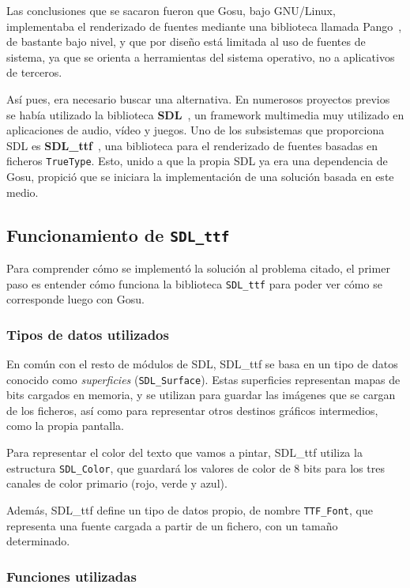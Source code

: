 Las conclusiones que se sacaron fueron que Gosu, bajo GNU/Linux, implementaba el
renderizado de fuentes mediante una biblioteca llamada Pango~\cite{Pango}, de
bastante bajo nivel, y que por diseño está limitada al uso de fuentes de
sistema, ya que se orienta a herramientas del sistema operativo, no a
aplicativos de terceros.

Así pues, era necesario buscar una alternativa. En numerosos proyectos
previos~\cite{robinson} se había utilizado la biblioteca
\textbf{SDL}~\cite{refsdl}, un framework multimedia muy utilizado en
aplicaciones de audio, vídeo y juegos. Uno de los subsistemas que proporciona
SDL es \textbf{SDL\_ttf}~\cite{refsdlttf}, una biblioteca para el renderizado de
fuentes basadas en ficheros \texttt{TrueType}. Esto, unido a que la propia SDL
ya era una dependencia de Gosu, propició que se iniciara la implementación de
una solución basada en este medio.

\subsection{Funcionamiento de \texttt{SDL\_ttf}}

Para comprender cómo se implementó la solución al problema citado, el primer
paso es entender cómo funciona la biblioteca \texttt{SDL\_ttf} para poder ver
cómo se corresponde luego con Gosu.

\subsubsection{Tipos de datos utilizados}

En común con el resto de módulos de SDL, SDL\_ttf se basa en un tipo de datos
conocido como \textit{superficies} (\texttt{SDL\_Surface}). Estas superficies
representan mapas de bits cargados en memoria, y se utilizan para guardar las
imágenes que se cargan de los ficheros, así como para representar otros destinos
gráficos intermedios, como la propia pantalla.

Para representar el color del texto que vamos a pintar, SDL\_ttf utiliza la
estructura \texttt{SDL\_Color}, que guardará los valores de color de 8 bits para
los tres canales de color primario (rojo, verde y azul).

Además, SDL\_ttf define un tipo de datos propio, de nombre \texttt{TTF\_Font}, que
representa una fuente cargada a partir de un fichero, con un tamaño determinado.

\subsubsection{Funciones utilizadas}

